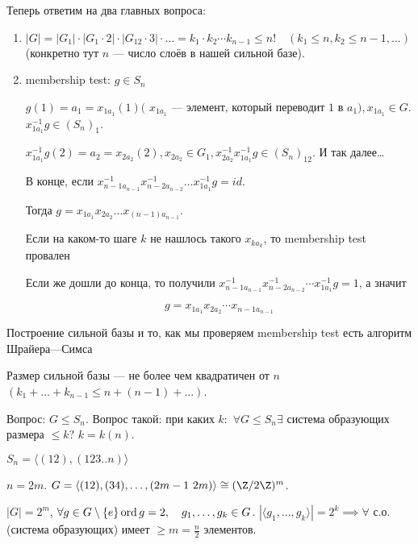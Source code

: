      Теперь ответим на два главных вопроса:
     \begin{enumerate}
         \item $|G| = |G_1| \cdot |G_1 \cdot 2| \cdot |G_{12} \cdot 3| \cdot \ldots = k_1 \cdot k_2 \cdots  k_{n-1} \le n! \quad (k_1 \le n, k_2 \le n-1, \ldots)$ (конкретно тут $n$ --- число слоёв в нашей сильной базе).

         \item membership test: $g \in S_n$

		 $g(1) = a_1 = x_{1a_1}(1) \text{( $x_{1a_1}$ --- элемент, который переводит 1 в $a_1$)} , x_{1a_1} \in G$. $x_{1a_1}^{-1} g \in (S_n)_1$.

        $x_{1a_1}^{-1}g(2) = a_2 = x_{2a_2}(2), x_{2a_2} \in G_1, x_{2a_2}^{-1}x_{1a_1}^{-1}g \in (S_n)_{12}$. И так далее\dots

             В конце, если $x_{n-1 a_{n-1}}^{-1} x_{n-2 a_{n-2}}^{-1} \ldots x_{1 a_1}^{-1} g= id$.

             Тогда $g = x_{1 a_1}x_{2 a_2}...x_{(n-1) a_{n-1}}$.

             Если на каком-то шаге $k$ не нашлось такого $x_{ka_k}$, то membership test провален

	     Если же дошли до конца, то получили $x_{n-1 a_{n-1}}^{-1} x_{n-2 a_{n-2}}^{-1} \cdots x_{1a_1}^{-1} g = 1$, а значит 

	     $$
	     g = x_{1a_1} x_{2a_2} \cdots x_{n-1 a_{n-1}}
	     $$
     \end{enumerate}

\begin{definition}
	Построение сильной базы и то, как мы проверяем membership test есть алгоритм Шрайера---Симса
\end{definition}
\begin{remark}
	Размер сильной базы --- не более чем квадратичен от $n$ $(k_1 + \ldots + k_{n-1} \le n + (n-1) + \ldots)$.
\end{remark}

Вопрос: $G \le S_n$. Вопрос такой: при каких $k\!:$ $\forall G \le S_n \exists$ система образующих размера $\le k$? $k = k(n)$.
\begin{exerc}
    $S_n = \langle (12), (123..n) \rangle$
\end{exerc}
\begin{example}
	$n = 2m$.  $G = \langle (12), (34), \ldots, (2m-1\ 2m)\rangle \cong (\Z / 2 \Z)^m$.

	$|G| = 2^m$,  $\forall g \in G\setminus\{e\} \operatorname{ord} g = 2, \quad g_1, \ldots, g_k \in G$. $|\langle g_1, \ldots, g_k \rangle| = 2^k \implies \forall$ с.о. (система образующих) имеет $\ge m = \frac{n}{2}$ элементов.
\end{example}

